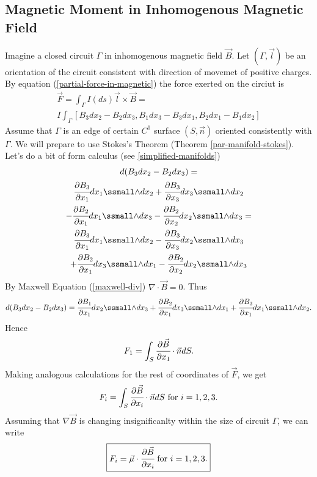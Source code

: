 \documentclass[main.tex]{subfiles}
\begin{document}
\subsection{Magnetic Moment in Inhomogenous Magnetic Field}
Imagine a closed circuit $\Gamma$ in inhomogenous magnetic field $\vec{B}$. Let $(\Gamma, \vec{l})$ be an orientation of the circuit consistent with direction of movemet of positive charges.
By equation (\ref{partial-force-in-magnetic}) the force exerted on the circiut is
\begin{multline}
\vec{F} = \int_\Gamma I(ds)\vec{l}\times \vec{B} = \\
I \int_\Gamma
[B_3 dx_2-B_2 dx_3,B_1 dx_3-B_3 dx_1,B_2 dx_1-B_1 dx_2]
\end{multline}
Assume that $\Gamma$ is an edge of certain $C^1$ surface $(S, \vec{n})$ oriented consistently with $\Gamma$. We will prepare to use Stokes's Theorem (Theorem \ref{par-manifold-stokes}).
Let's do a bit of form calculus (see \ref{simplified-manifolds})
\begin{multline}
d(B_3 dx_2 - B_2 dx_3) = \\
\cfrac{\partial B_3}{\partial x_1} dx_1\form dx_2 + \cfrac{\partial B_3}{\partial x_3} dx_3\form dx_2 \\
-\cfrac{\partial B_2}{\partial x_1} dx_1\form dx_3 - \cfrac{\partial B_2}{\partial x_2} dx_2\form dx_3 = \\
\cfrac{\partial B_3}{\partial x_1} dx_1\form dx_2 - \cfrac{\partial B_3}{\partial x_3} dx_2\form dx_3 \\
+\cfrac{\partial B_2}{\partial x_1} dx_3\form dx_1 - \cfrac{\partial B_2}{\partial x_2} dx_2\form dx_3\\
\end{multline}
By Maxwell Equation (\ref{maxwell-div}) $\nabla \cdot \vec{B} = 0$.
Thus
\begin{equation}
d(B_3 dx_2 - B_2 dx_3) = 
\cfrac{\partial B_1}{\partial x_1} dx_2\form dx_3 +
\cfrac{\partial B_2}{\partial x_1} dx_3\form dx_1 +
\cfrac{\partial B_3}{\partial x_1} dx_1\form dx_2.
\end{equation}
Hence
\begin{equation}
F_1 = \int_S \cfrac{\partial \vec{B}}{\partial x_1} \cdot \vec{n} dS.
\end{equation}
Making analogous calculations for the rest of coordinates of $\vec{F}$, we get
\begin{equation}
F_i = \int_S \cfrac{\partial \vec{B}}{\partial x_i} \cdot \vec{n} dS \text{ for } i = 1,2,3.
\end{equation}
Assuming that $\nabla \vec{B}$ is changing insignificanlty within the size of circuit $\Gamma$, we can write
\begin{equation}
\boxed{
F_i = \vec{\mu} \cdot \cfrac{\partial \vec{B}}{\partial x_i} \text{ for } i = 1,2,3.}
\end{equation}
\end{document}
